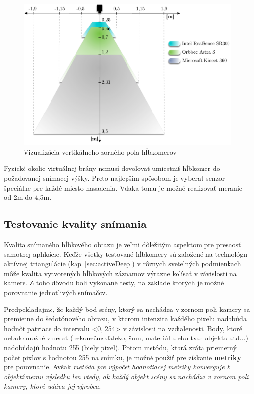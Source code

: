 \begin{figure}[H]
\begin{center}
	\includegraphics[scale=0.60]{images/camerasViews}
	\caption{Vizualizácia vertikálneho zorného pola hĺbkomerov}
	\end{center}
\end{figure}

Fyzické okolie virtuálnej brány nemusí dovoľovať umiestniť hĺbkomer do požadovanej snímacej výšky. Preto najlepším spôsobom je vyberať senzor špeciálne pre každé miesto nasadenia. Vďaka tomu je možné realizovať meranie od 2m do 4,5m.



\subsection{Testovanie kvality snímania}
Kvalita snímaného hĺbkového obrazu je veľmi dôležitým aspektom pre presnosť samotnej aplikácie. Keďže všetky testované hĺbkomery sú založené na technológii aktívnej triangulácie (kap~\ref{sec:activeDeep}) v rôznych svetelných podmienkach môže kvalita vytvorených hĺbkových záznamov výrazne kolísať v závislosti na kamere. Z toho dôvodu boli vykonané testy, na základe ktorých je možné porovnanie jednotlivých snímačov. 

Predpokladajme, že každý bod scény, ktorý sa nachádza v zornom poli kamery sa premietne do šedotónového obrazu, v ktorom intenzita každého pixelu nadobúda hodnôt patriace do intervalu <0, 254> v závislosti na vzdialenosti. Body, ktoré nebolo možné zmerať (nekonečne ďaleko, šum, materiál alebo tvar objektu atd...) nadobúdajú hodnotu 255 (biely pixel). Potom metódu, ktorá zráta priemerný počet pixlov s hodnotou 255 na snímku, je možné použiť pre získanie \textbf{metriky} pre porovnanie. Avšak \textit{metóda pre výpočet hodnotiacej metriky konverguje k objektívnemu výsledku len vtedy, ak každý objekt scény sa nachádza v zornom poli kamery, ktoré udáva jej výrobca.}       

